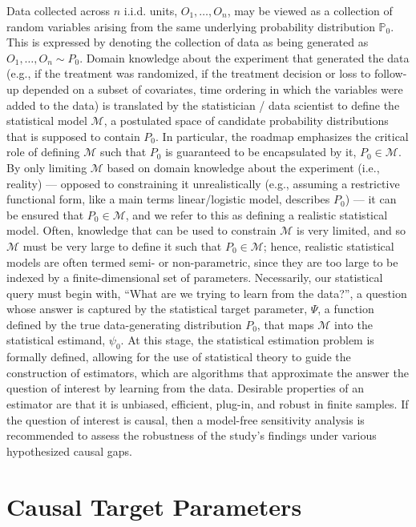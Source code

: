 \documentclass[
  12pt, krantz2,
]{krantz}
\renewcommand{\P}{\mathbb{P}}
\newcommand{\M}{\mathcal{M}}
\newcommand{\1}{\mathbbm{1}}
\theoremstyle{definition}
\theoremstyle{definition}
\theoremstyle{definition}
\theoremstyle{definition}
\theoremstyle{remark}
\begin{document}
Data collected across \(n\) i.i.d. units, \(O_1, \ldots, O_n\), may be viewed as a
collection of random variables arising from the same underlying probability
distribution \(\P_0\). This is expressed by denoting the collection of data as
being generated as \(O_1, \ldots, O_n \sim P_0\). Domain knowledge about the
experiment that generated the data (e.g., if the treatment was randomized, if
the treatment decision or loss to follow-up depended on a subset of covariates,
time ordering in which the variables were added to the data) is translated by
the statistician / data scientist to define the statistical model \(\M\), a
postulated space of candidate probability distributions that is supposed to
contain \(P_0\). In particular, the roadmap emphasizes the critical role of
defining \(\M\) such that \(P_0\) is guaranteed to be encapsulated by it, \(P_0 \in \M\). By only limiting \(\M\) based on domain knowledge about the experiment (i.e.,
reality) --- opposed to constraining it unrealistically (e.g., assuming a
restrictive functional form, like a main terms linear/logistic model, describes
\(P_0\)) --- it can be ensured that \(P_0 \in \M\), and we refer to this as defining
a realistic statistical model. Often, knowledge that can be used to constrain
\(\M\) is very limited, and so \(\M\) must be very large to define it such that \(P_0 \in \M\); hence, realistic statistical models are often termed semi- or
non-parametric, since they are too large to be indexed by a finite-dimensional
set of parameters. Necessarily, our statistical query must begin with, ``What are
we trying to learn from the data?'', a question whose answer is captured by the
statistical target parameter, \(\Psi\), a function defined by the true
data-generating distribution \(P_0\), that maps \(\M\) into the statistical
estimand, \(\psi_0\). At this stage, the statistical estimation problem is
formally defined, allowing for the use of statistical theory to guide the
construction of estimators, which are algorithms that approximate the answer the
question of interest by learning from the data. Desirable properties of an
estimator are that it is unbiased, efficient, plug-in, and robust in finite
samples. If the question of interest is causal, then a model-free sensitivity
analysis is recommended to assess the robustness of the study's findings under
various hypothesized causal gaps.

\hypertarget{causal}{%
\section{Causal Target Parameters}\label{causal}}
\end{document}
